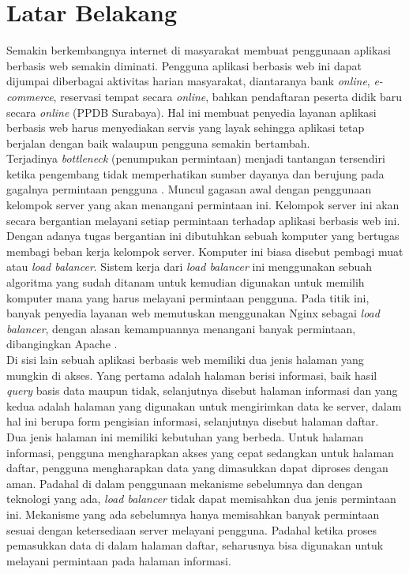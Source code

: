 \documentclass{ta-its}
\begin{document}
        \section{Latar Belakang}
            Semakin berkembangnya internet di masyarakat membuat penggunaan aplikasi berbasis web semakin diminati. Pengguna aplikasi berbasis web ini dapat dijumpai diberbagai aktivitas harian masyarakat, diantaranya bank \emph{online}, \emph{e-commerce}, reservasi tempat secara \emph{online}, bahkan pendaftaran peserta didik baru secara \emph{online} (PPDB Surabaya). Hal ini membuat penyedia layanan aplikasi berbasis web harus menyediakan servis yang layak sehingga aplikasi tetap berjalan dengan baik walaupun pengguna semakin bertambah.\\
			\indent Terjadinya \emph{bottleneck} (penumpukan permintaan) menjadi tantangan tersendiri ketika pengembang tidak memperhatikan sumber dayanya dan berujung pada gagalnya permintaan pengguna \cite{paperAlgoritma}. Muncul gagasan awal dengan penggunaan kelompok server yang akan menangani permintaan ini. Kelompok server ini akan secara bergantian melayani setiap permintaan terhadap aplikasi berbasis web ini. Dengan adanya tugas bergantian ini dibutuhkan sebuah komputer yang bertugas membagi beban kerja kelompok server. Komputer ini biasa disebut pembagi muat atau \emph{load balancer}. Sistem kerja dari \emph{load balancer} ini menggunakan sebuah algoritma yang sudah ditanam untuk kemudian digunakan untuk memilih komputer mana yang harus melayani permintaan pengguna. Pada titik ini, banyak penyedia layanan web memutuskan menggunakan Nginx sebagai \textit{load balancer}, dengan alasan kemampuannya menangani banyak permintaan, dibangingkan Apache \cite{quoraNginx}\cite{aosaNginx}. \\
			\indent Di sisi lain sebuah aplikasi berbasis web memiliki dua jenis halaman yang mungkin di akses. Yang pertama adalah halaman berisi informasi, baik hasil \emph{query} basis data maupun tidak, selanjutnya disebut halaman informasi dan yang kedua adalah halaman yang digunakan untuk mengirimkan data ke server, dalam hal ini berupa form pengisian informasi, selanjutnya disebut halaman daftar. \\
			\indent Dua jenis halaman ini memiliki kebutuhan yang berbeda. Untuk halaman informasi, pengguna mengharapkan akses yang cepat sedangkan untuk halaman daftar, pengguna mengharapkan data yang dimasukkan dapat diproses dengan aman. Padahal di dalam penggunaan mekanisme sebelumnya dan dengan teknologi yang ada, \emph{load balancer} tidak dapat memisahkan dua jenis permintaan ini. Mekanisme yang ada sebelumnya hanya memisahkan banyak permintaan sesuai dengan ketersediaan server melayani pengguna. Padahal ketika proses pemasukkan data di dalam halaman daftar, seharusnya bisa digunakan untuk melayani permintaan pada halaman informasi. \\
\end{document}
